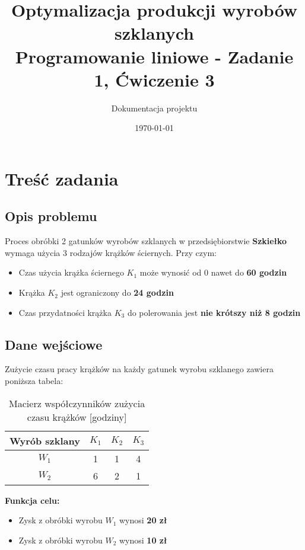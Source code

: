 \documentclass[12pt,a4paper]{article}
\title{\textbf{Optymalizacja produkcji wyrobów szklanych} \\ 
\large Programowanie liniowe - Zadanie 1, Ćwiczenie 3}
\author{Dokumentacja projektu}
\date{\today}
\begin{document}
\maketitle
\tableofcontents
\newpage

\section{Treść zadania}

\subsection{Opis problemu}

Proces obróbki 2 gatunków wyrobów szklanych w przedsiębiorstwie \textbf{Szkiełko} wymaga użycia 3 rodzajów krążków ściernych. Przy czym:

\begin{itemize}
    \item Czas użycia krążka ściernego $K_1$ może wynosić od 0 nawet do \textbf{60 godzin}
    \item Krążka $K_2$ jest ograniczony do \textbf{24 godzin}
    \item Czas przydatności krążka $K_3$ do polerowania jest \textbf{nie krótszy niż 8 godzin}
\end{itemize}

\subsection{Dane wejściowe}

Zużycie czasu pracy krążków na każdy gatunek wyrobu szklanego zawiera poniższa tabela:

\begin{table}[H]
\centering
\begin{tabular}{|c|c|c|c|}
\hline
\textbf{Wyrób szklany} & $K_1$ & $K_2$ & $K_3$ \\ \hline
$W_1$ & 1 & 1 & 4 \\ \hline
$W_2$ & 6 & 2 & 1 \\ \hline
\end{tabular}
\caption{Macierz współczynników zużycia czasu krążków [godziny]}
\end{table}

\textbf{Funkcja celu:}
\begin{itemize}
    \item Zysk z obróbki wyrobu $W_1$ wynosi \textbf{20 zł}
    \item Zysk z obróbki wyrobu $W_2$ wynosi \textbf{10 zł}
\end{itemize}
\end{document}
